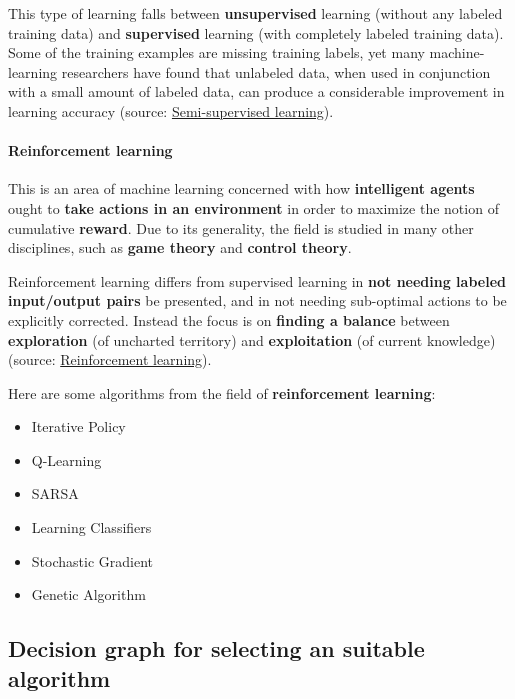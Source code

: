 \documentclass [oneside,10pt,a4paper,ngerman,BCOR10mm,headsepline,parindent,final]{scrartcl}
\providecommand{\tightlist}{%
      \setlength{\itemsep}{0pt}\setlength{\parskip}{0pt}}
\begin{document}
This type of learning falls between \textbf{unsupervised} learning
(without any labeled training data) and \textbf{supervised} learning
(with completely labeled training data). Some of the training examples
are missing training labels, yet many machine-learning researchers have
found that unlabeled data, when used in conjunction with a small amount
of labeled data, can produce a considerable improvement in learning
accuracy (source:
\href{https://en.wikipedia.org/wiki/Machine_learning\#Semi-supervised_learning}{Semi-supervised
learning}).

    \hypertarget{reinforcement-learning}{%
\paragraph{Reinforcement learning}\label{reinforcement-learning}}

This is an area of machine learning concerned with how
\textbf{intelligent agents} ought to \textbf{take actions in an
environment} in order to maximize the notion of cumulative
\textbf{reward}. Due to its generality, the field is studied in many
other disciplines, such as \textbf{game theory} and \textbf{control
theory}.

Reinforcement learning differs from supervised learning in \textbf{not
needing labeled input/output pairs} be presented, and in not needing
sub-optimal actions to be explicitly corrected. Instead the focus is on
\textbf{finding a balance} between \textbf{exploration} (of uncharted
territory) and \textbf{exploitation} (of current knowledge) (source:
\href{https://en.wikipedia.org/wiki/Reinforcement_learning}{Reinforcement
learning}).

Here are some algorithms from the field of \textbf{reinforcement
learning}:

\begin{itemize}
\tightlist
\item
  Iterative Policy
\item
  Q-Learning
\item
  SARSA
\item
  Learning Classifiers
\item
  Stochastic Gradient
\item
  Genetic Algorithm
\end{itemize}

    \hypertarget{decision-graph-for-selecting-an-suitable-algorithm}{%
\subsection{Decision graph for selecting an suitable
algorithm}\label{decision-graph-for-selecting-an-suitable-algorithm}}
\end{document}

